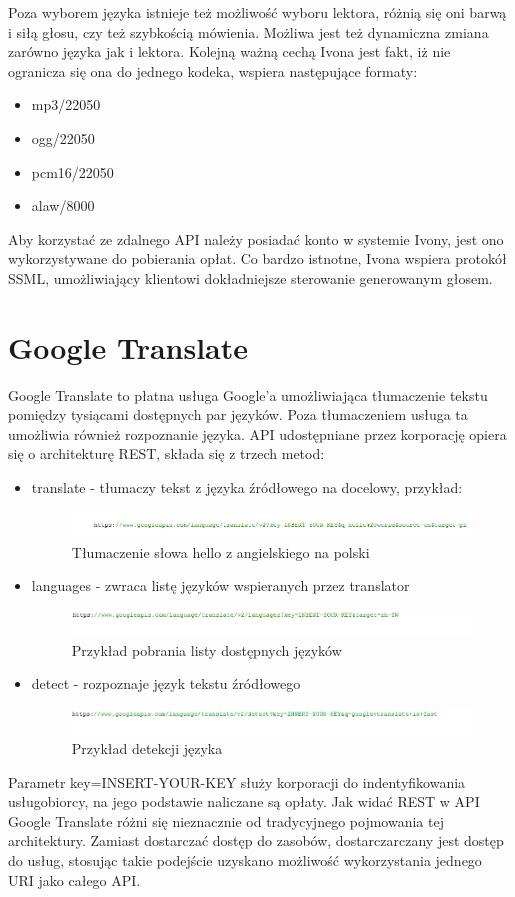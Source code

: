 Poza wyborem języka istnieje też możliwość wyboru lektora, różnią się oni barwą i siłą głosu, czy też szybkością mówienia. Możliwa jest też dynamiczna zmiana zarówno języka jak i lektora. Kolejną ważną cechą Ivona jest fakt, iż nie ogranicza się ona do jednego kodeka, wspiera następujące formaty:
\begin{itemize}
	\item mp3/22050
	\item ogg/22050
	\item pcm16/22050
	\item alaw/8000
\end{itemize}
 Aby korzystać ze zdalnego API należy posiadać konto w systemie Ivony, jest ono wykorzystywane do pobierania opłat. Co bardzo istnotne, Ivona wspiera protokół SSML, umożliwiający klientowi dokładniejsze sterowanie generowanym głosem. 

\section{Google Translate}
Google Translate to płatna usługa Google'a umożliwiająca tłumaczenie tekstu pomiędzy tysiącami dostępnych par języków. Poza tłumaczeniem usługa ta umożliwia również rozpoznanie języka. API udostępniane przez korporację opiera się o architekturę REST, składa się z trzech metod:
\begin{itemize}
	\item translate - tłumaczy tekst z języka źródłowego na docelowy, przykład:
		\begin{figure}[!h]
			\centering
			\includegraphics[scale=0.95]{translateExp.png} 
			\caption{Tłumaczenie słowa hello z angielskiego na polski}
		\end{figure}
	\item languages - zwraca listę języków wspieranych przez translator
		\begin{figure}[!h]
			\centering
			\includegraphics[scale=0.95]{listExp.png} 
			\caption{Przykład pobrania listy dostępnych języków}
		\end{figure}
	\item detect - rozpoznaje język tekstu źródłowego
		\begin{figure}[!h]
			\centering
			\includegraphics[scale=0.95]{detectExp.png} 
			\caption{Przykład detekcji języka}
		\end{figure}
\end{itemize}
Parametr key=INSERT-YOUR-KEY służy korporacji do indentyfikowania usługobiorcy, na jego podstawie naliczane są opłaty. Jak widać REST w API Google Translate różni się nieznacznie od tradycyjnego pojmowania tej architektury. Zamiast dostarczać dostęp do zasobów, dostarczarczany jest dostęp do usług, stosując takie podejście uzyskano możliwość wykorzystania jednego URI jako całego API. 

